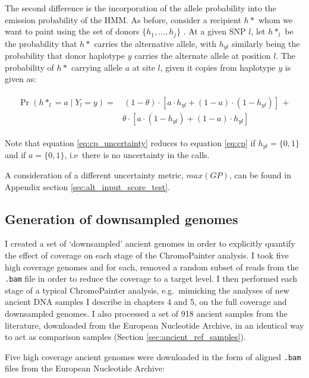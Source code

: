 {                 
The second difference is the incorporation of the allele probability into the emission probability of the HMM. As before, consider a recipient $h*$ whom we want to paint using the set of donors $\{h_{1}, ..., h_{j}\}$ . At a given SNP $l$, let $h*_{l}$ be the probability that $h*$ carries the alternative allele, with $h_{yl}$ similarly being the probability that donor haplotype $y$ carries the alternate allele at position $l$. The probability of $h*$ carrying allele $a$ at site $l$, given it copies from haplotype $y$ is given as:

\begin{align} \label{eq:cp_uncertainty}
\begin{split}
	\Pr(h*_{l} = a \mid Y_{l} = y) = &
				\,(1 - \theta) \cdot [a \cdot h_{yl} + (1-a) \cdot (1-h_{yl})]\, +  \\
				& \theta \cdot [a \cdot (1-h_{yl}) + (1-a) \cdot h_{yl}]
\end{split}
\end{align}

Note that equation \ref{eq:cp_uncertainty} reduces to equation \ref{eq:cp} if $h_{yl} = \{0,1\}$ and if $a = \{0,1\}$, i.e\ there is no uncertainty in the calls.

A consideration of a different uncertainty metric, $max(GP)$, can be found in Appendix section \ref{sec:alt_input_score_test}.


\subsection{Generation of downsampled genomes}

 I created a set of `downsampled' ancient genomes in order to explicitly quantify the effect of coverage on each stage of the ChromoPainter analysis. I took five high coverage genomes and for each, removed a random subset of reads from the \texttt{.bam} file in order to reduce the coverage to a target level. I then performed each stage of a typical ChromoPainter analysis, e.g.\ mimicking the analyses of new ancient DNA samples I describe in chapters 4 and 5, on the full coverage and downsampled genomes. I also processed a set of 918 ancient samples from the literature, downloaded from the European Nucleotide Archive, in an identical way to act as comparison samples (Section \ref{sec:ancient_ref_samples}).

Five high coverage ancient genomes were downloaded in the form of aligned \texttt{.bam} files from the European Nucleotide Archive:

}
